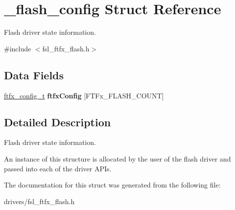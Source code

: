 \hypertarget{struct__flash__config}{}\section{\+\_\+flash\+\_\+config Struct Reference}
\label{struct__flash__config}


Flash driver state information.  




{\ttfamily \#include $<$fsl\+\_\+ftfx\+\_\+flash.\+h$>$}

\subsection*{Data Fields}
\begin{DoxyCompactItemize}
\item 
\mbox{\label{struct__flash__config_ac62a9db61ca667fa1fb4b7cf498d5586}} 
\mbox{\hyperlink{group__ftfx__controller_gab0196063c05bffb4cd2f249699a3378c}{ftfx\+\_\+config\+\_\+t}} {\bfseries ftfx\+Config} \mbox{[}F\+T\+Fx\+\_\+\+F\+L\+A\+S\+H\+\_\+\+C\+O\+U\+NT\mbox{]}
\end{DoxyCompactItemize}


\subsection{Detailed Description}
Flash driver state information. 

An instance of this structure is allocated by the user of the flash driver and passed into each of the driver A\+P\+Is. 

The documentation for this struct was generated from the following file\+:\begin{DoxyCompactItemize}
\item 
drivers/fsl\+\_\+ftfx\+\_\+flash.\+h\end{DoxyCompactItemize}
